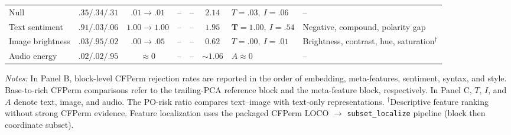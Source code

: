 \begin{table}[ht]
{\begin{tabular}{lcccccll}
Null
& $.35/.34/.31$
& $.01\to.01$
& --
& --
& $2.14$
& $T=.03,\ I=.06$
& -- \\

Text sentiment
& $\mathbf{.91}/.03/.06$
& $1.00\to1.00$
& --
& --
& $1.95$
& $\mathbf{T=1.00},\ I=.54$
& Negative, compound, polarity gap \\

Image brightness
& $.03/\mathbf{.95}/.02$
& $.00\to.05$
& --
& --
& $\mathbf{0.62}$
& $T=.00,\ I=.01$
& Brightness, contrast, hue, saturation$^\dagger$ \\

Audio energy
& $.02/.02/\mathbf{.95}$
& $\approx0$
& --
& --
& $\sim1.06$
& $A\approx0$
& -- \\

\bottomrule
\end{tabular}
}

\vspace{3pt}
\begin{minipage}{\textwidth}
\footnotesize
\textit{Notes:}
In Panel B, block-level CFPerm rejection rates are reported
in the order of embedding, meta-features, sentiment,
syntax, and style. Base-to-rich CFPerm comparisons refer
to the trailing-PCA reference block and the meta-feature
block, respectively.
In Panel C, $T$, $I$, and $A$ denote text, image, and audio.
The PO-risk ratio compares text--image with text-only
representations.
$^\dagger$Descriptive feature ranking without strong
CFPerm evidence.
Feature localization uses the packaged CFPerm LOCO $\to$
\texttt{subset\_localize} pipeline (block then coordinate subset).
\end{minipage}
\end{table}
